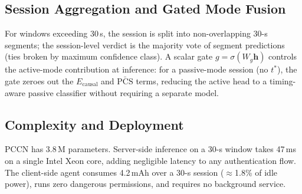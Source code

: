 \subsection{Session Aggregation and Gated Mode Fusion}
\label{sec:aggregation}

For windows exceeding 30\,s, the session is split into non-overlapping 30-s segments;
the session-level verdict is the majority vote of segment predictions (ties broken by
maximum confidence class).%
A scalar gate $g = \sigma(W_g \mathbf{h})$ controls the active-mode contribution at
inference: for a passive-mode session (no $t^*$), the gate zeroes out the
$E_{\mathrm{causal}}$ and $\bar{\mathrm{PCS}}$ terms, reducing the active head to a
timing-aware passive classifier without requiring a separate model.%

\subsection{Complexity and Deployment}
\label{sec:complexity}

PCCN has 3.8\,M parameters.%
Server-side inference on a 30-s window takes 47\,ms on a single Intel Xeon core,
adding negligible latency to any authentication flow.%
The client-side agent consumes 4.2\,mAh over a 30-s session
($\approx$1.8\% of idle power), runs zero dangerous permissions, and requires
no background service.%
